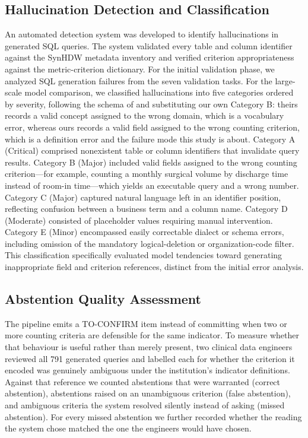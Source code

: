\documentclass[applsci,article,submit,pdftex,oneauthor]{Definitions/mdpi}
\begin{document}
\subsection{Hallucination Detection and Classification}
An automated detection system was developed to identify hallucinations in
generated SQL queries. The system validated every table and column identifier
against the SynHDW metadata inventory and verified criterion appropriateness
against the metric-criterion dictionary. For the initial validation phase, we
analyzed SQL generation failures from the seven validation tasks. For the
large-scale model comparison, we classified hallucinations into five categories
ordered by severity, following the schema of \cite{lee2025} and substituting our
own Category B: theirs records a valid concept assigned to the wrong domain, which
is a vocabulary error, whereas ours records a valid field assigned to the wrong
counting criterion, which is a definition error and the failure mode this study is
about. Category A (Critical) comprised
nonexistent table or column identifiers that invalidate query results. Category
B (Major) included valid fields assigned to the wrong counting criterion---for
example, counting a monthly surgical volume by discharge time instead of room-in
time---which yields an executable query and a wrong number. Category C (Major)
captured natural language left in an identifier position, reflecting confusion
between a business term and a column name. Category D (Moderate) consisted of
placeholder values requiring manual intervention. Category E (Minor) encompassed
easily correctable dialect or schema errors, including omission of the mandatory
logical-deletion or organization-code filter. This classification specifically
evaluated model tendencies toward generating inappropriate field and criterion
references, distinct from the initial error analysis.

\subsection{Abstention Quality Assessment}
The pipeline emits a TO-CONFIRM item instead of committing when two or more
counting criteria are defensible for the same indicator. To measure whether that
behaviour is useful rather than merely present, two clinical data engineers
reviewed all 791 generated queries and labelled each for whether the criterion it
encoded was genuinely ambiguous under the institution's indicator definitions.
Against that reference we counted abstentions that were warranted (correct
abstention), abstentions raised on an unambiguous criterion (false abstention),
and ambiguous criteria the system resolved silently instead of asking (missed
abstention). For every missed abstention we further recorded whether the reading
the system chose matched the one the engineers would have chosen.
\end{document}
